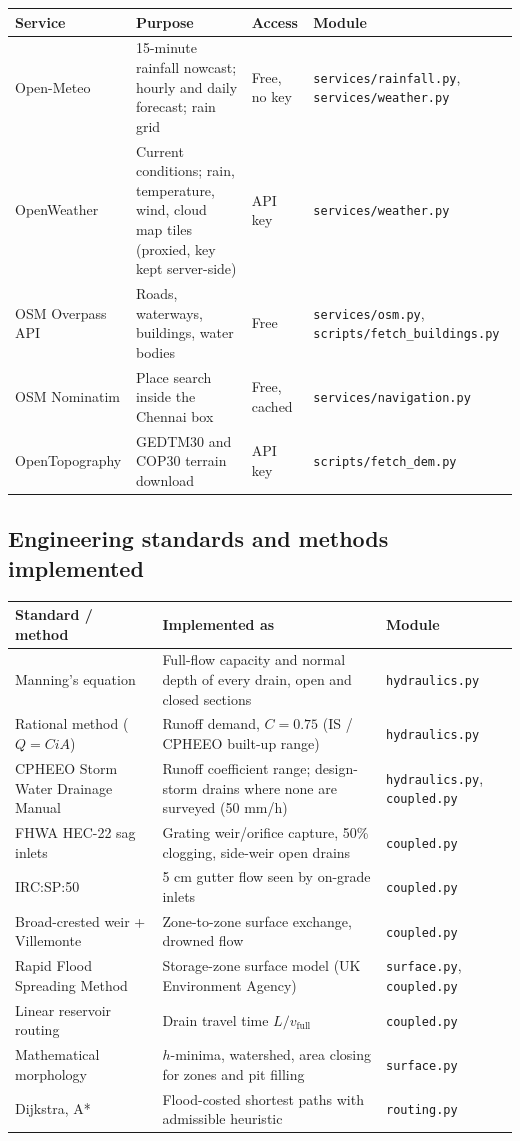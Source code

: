 \documentclass[11pt,a4paper]{article}
\begin{document}
{\small
\begin{longtable}{@{}p{3.4cm}p{5.0cm}p{2.3cm}p{4.0cm}@{}}
\toprule
\textbf{Service} & \textbf{Purpose} & \textbf{Access} & \textbf{Module}\\
\midrule\endhead
Open-Meteo & 15-minute rainfall nowcast; hourly and daily forecast; rain grid & Free, no key & \texttt{services/rainfall.py}, \texttt{services/weather.py}\\
OpenWeather & Current conditions; rain, temperature, wind, cloud map tiles (proxied, key kept server-side) & API key & \texttt{services/weather.py}\\
OSM Overpass API & Roads, waterways, buildings, water bodies & Free & \texttt{services/osm.py}, \texttt{scripts/fetch\_buildings.py}\\
OSM Nominatim & Place search inside the Chennai box & Free, cached & \texttt{services/navigation.py}\\
OpenTopography & GEDTM30 and COP30 terrain download & API key & \texttt{scripts/fetch\_dem.py}\\
\bottomrule
\end{longtable}}

\subsection{Engineering standards and methods implemented}

{\small
\begin{longtable}{@{}p{4.2cm}p{7.0cm}p{3.5cm}@{}}
\toprule
\textbf{Standard / method} & \textbf{Implemented as} & \textbf{Module}\\
\midrule\endhead
Manning's equation & Full-flow capacity and normal depth of every drain, open and closed sections & \texttt{hydraulics.py}\\
Rational method ($Q = CiA$) & Runoff demand, $C = 0.75$ (IS / CPHEEO built-up range) & \texttt{hydraulics.py}\\
CPHEEO Storm Water Drainage Manual & Runoff coefficient range; design-storm drains where none are surveyed (50 mm/h) & \texttt{hydraulics.py}, \texttt{coupled.py}\\
FHWA HEC-22 sag inlets & Grating weir/orifice capture, 50\% clogging, side-weir open drains & \texttt{coupled.py}\\
IRC:SP:50 & 5 cm gutter flow seen by on-grade inlets & \texttt{coupled.py}\\
Broad-crested weir + Villemonte & Zone-to-zone surface exchange, drowned flow & \texttt{coupled.py}\\
Rapid Flood Spreading Method & Storage-zone surface model (UK Environment Agency) & \texttt{surface.py}, \texttt{coupled.py}\\
Linear reservoir routing & Drain travel time $L / v_{\text{full}}$ & \texttt{coupled.py}\\
Mathematical morphology & $h$-minima, watershed, area closing for zones and pit filling & \texttt{surface.py}\\
Dijkstra, A* & Flood-costed shortest paths with admissible heuristic & \texttt{routing.py}\\
\bottomrule
\end{longtable}}
\end{document}

